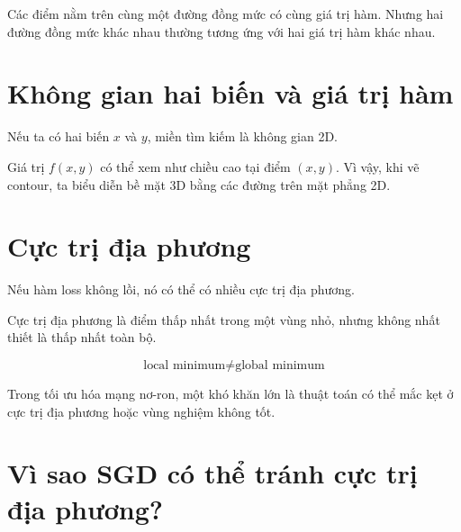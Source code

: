 \documentclass[12pt,a4paper]{report}
\begin{document}
\begin{ghinho}
Các điểm nằm trên cùng một đường đồng mức có cùng giá trị hàm. Nhưng hai đường đồng mức khác nhau thường tương ứng với hai giá trị hàm khác nhau.
\end{ghinho}

\section{Không gian hai biến và giá trị hàm}

Nếu ta có hai biến $x$ và $y$, miền tìm kiếm là không gian 2D.

Giá trị $f(x,y)$ có thể xem như chiều cao tại điểm $(x,y)$. Vì vậy, khi vẽ contour, ta biểu diễn bề mặt 3D bằng các đường trên mặt phẳng 2D.

\begin{center}
\end{center}

\section{Cực trị địa phương}

Nếu hàm loss không lồi, nó có thể có nhiều cực trị địa phương.

Cực trị địa phương là điểm thấp nhất trong một vùng nhỏ, nhưng không nhất thiết là thấp nhất toàn bộ.

\[
    \text{local minimum} \neq \text{global minimum}
\]

\begin{canhbao}
Trong tối ưu hóa mạng nơ-ron, một khó khăn lớn là thuật toán có thể mắc kẹt ở cực trị địa phương hoặc vùng nghiệm không tốt.
\end{canhbao}

\section{Vì sao SGD có thể tránh cực trị địa phương?}
\end{document}
